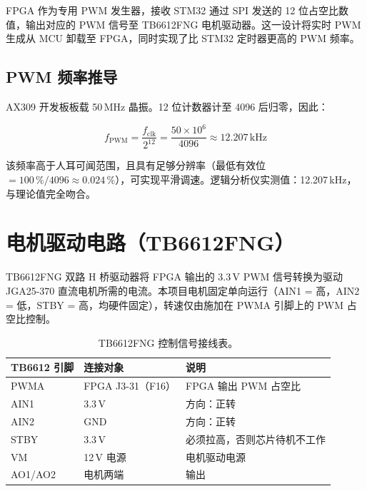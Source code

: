 \documentclass[12pt, a4paper]{ctexrep}
\begin{document}
FPGA 作为专用 PWM 发生器，接收 STM32 通过 SPI 发送的 12 位占空比数值，输出对应的 PWM 信号至 TB6612FNG 电机驱动器。这一设计将实时 PWM 生成从 MCU 卸载至 FPGA，同时实现了比 STM32 定时器更高的 PWM 频率。

\subsection{PWM 频率推导}

AX309 开发板板载 50\,MHz 晶振。12 位计数器计至 4096 后归零，因此：

\begin{equation}
    f_{\text{PWM}} = \frac{f_{\text{clk}}}{2^{12}} = \frac{50 \times 10^6}{4096}
    \approx 12.207\,\text{kHz}
    \label{eq:pwm_freq}
\end{equation}

该频率高于人耳可闻范围，且具有足够分辨率（最低有效位 $= 100\,\%/4096 \approx 0.024\,\%$），可实现平滑调速。逻辑分析仪实测值：12.207\,kHz，与理论值完全吻合。

\section{电机驱动电路（TB6612FNG）}

TB6612FNG 双路 H 桥驱动器将 FPGA 输出的 3.3\,V PWM 信号转换为驱动 JGA25-370 直流电机所需的电流。本项目电机固定单向运行（AIN1 = 高，AIN2 = 低，STBY = 高，均硬件固定），转速仅由施加在 PWMA 引脚上的 PWM 占空比控制。

\begin{table}[H]
    \centering
    \caption{TB6612FNG 控制信号接线表。}
    \label{tab:tb6612}
    \begin{tabular}{lll}
        \toprule
        \textbf{TB6612 引脚} & \textbf{连接对象} & \textbf{说明} \\
        \midrule
        PWMA    & FPGA J3-31（F16） & FPGA 输出 PWM 占空比 \\
        AIN1    & 3.3\,V            & 方向：正转 \\
        AIN2    & GND               & 方向：正转 \\
        STBY    & 3.3\,V            & 必须拉高，否则芯片待机不工作 \\
        VM      & 12\,V 电源        & 电机驱动电源 \\
        AO1/AO2 & 电机两端          & 输出 \\
        \bottomrule
    \end{tabular}
\end{table}
\end{document}
